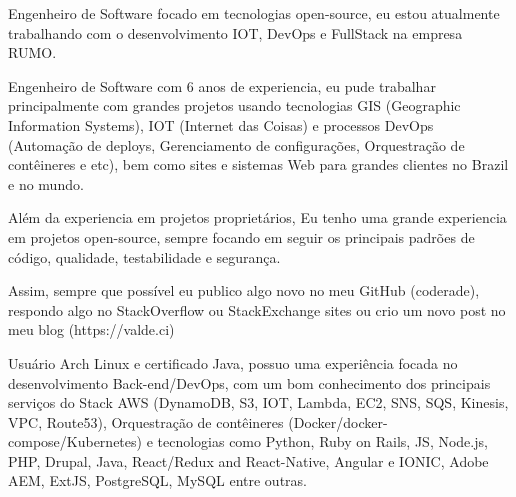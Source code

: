 

\begin{cvparagraph}

Engenheiro de Software focado em tecnologias open-source, eu estou atualmente trabalhando com o desenvolvimento IOT, DevOps e FullStack na empresa RUMO.

Engenheiro de Software com 6 anos de experiencia, eu pude trabalhar principalmente com grandes projetos usando tecnologias GIS (Geographic Information Systems), IOT (Internet das Coisas) e processos DevOps (Automação de deploys, Gerenciamento de configurações, Orquestração de contêineres e etc), bem como sites e sistemas Web para grandes clientes no Brazil  e no mundo.

Além da experiencia em projetos proprietários, Eu tenho uma grande experiencia em projetos open-source, sempre focando em seguir os principais padrões de código, qualidade, testabilidade e segurança.

Assim, sempre que possível eu publico algo novo no meu GitHub (coderade), respondo  algo no StackOverflow ou StackExchange sites ou crio um novo post no meu blog (https://valde.ci)

Usuário Arch Linux e certificado Java, possuo uma experiência focada no desenvolvimento Back-end/DevOps, com um bom conhecimento dos principais serviços do Stack AWS (DynamoDB, S3, IOT, Lambda, EC2, SNS, SQS, Kinesis, VPC, Route53), Orquestração de contêineres (Docker/docker-compose/Kubernetes) e tecnologias como Python, Ruby on Rails, JS, Node.js, PHP, Drupal, Java, React/Redux and React-Native, Angular e IONIC, Adobe AEM, ExtJS, PostgreSQL, MySQL entre outras.


\end{cvparagraph}
